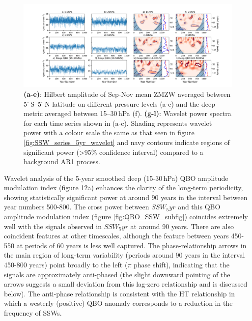 
\begin{center}
\begin{figure}[h!]
\includegraphics[width = \linewidth]{Figures/Figures-origins/QBO_levels_amp.png}
\caption[QBO amplitude timeseries and associated wavelet power spectra at different levels in UKESM]{\textbf{(a-e)}: Hilbert amplitude of Sep-Nov mean ZMZW averaged between 5$^\circ$\,S--5$^\circ$\,N latitude on different pressure levels (a-e) and the deep metric averaged between 15--30\,hPa (f). \textbf{(g-l)}: Wavelet power spectra for each time series shown in (a-c). Shading represents wavelet power with a colour scale the same as that seen in figure \ref{fig:SSW_series_5yr_wavelet} and navy contours indicate regions of significant power (>95\% confidence interval) compared to a background AR1 process.}
\label{fig:QBO_levs_amp}
\end{figure}
\end{center}


Wavelet analysis of the 5-year smoothed deep (15-30\,hPa) QBO amplitude modulation index (figure 12a) enhances the clarity of the long-term periodicity, showing statistically significant power at around 90 years in the interval between year numbers 500-800. The cross power between $SSW_5yr$ and this QBO amplitude modulation index (figure \ref{fig:QBO_SSW_subfig}) coincides extremely well with the signals observed in $SSW_5yr$ at around 90 years. There are also coincident features at other timescales, although the feature between years 450-550 at periods of 60 years is less well captured. The phase-relationship arrows in the main region of long-term variability (periods around 90 years in the interval 450-800 years) point broadly to the left ($\pi$ phase shift), indicating that the signals are approximately anti-phased (the slight downward pointing of the arrows suggests a small deviation from this lag-zero relationship and is discussed below). The anti-phase relationship is consistent with the HT relationship in which a westerly (positive) QBO anomaly corresponds to a reduction in the frequency of SSWs.

